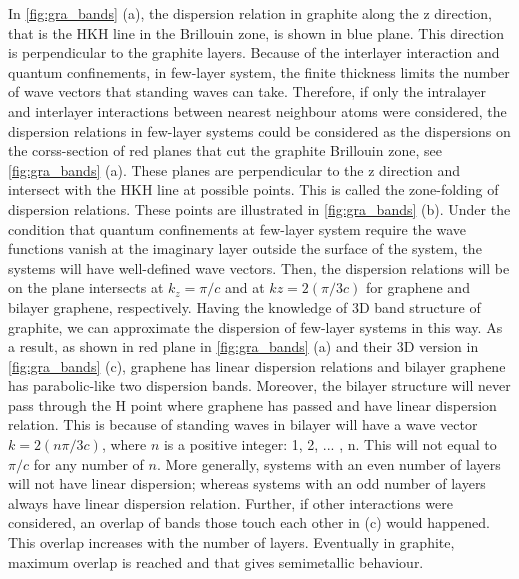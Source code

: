 In \autoref{fig:gra_bands} (a), the dispersion relation in graphite along the z direction, that is the HKH line in the Brillouin zone, is shown in blue plane. This direction is perpendicular to the graphite layers. Because of the interlayer interaction and quantum confinements, in few-layer system, the finite thickness limits the number of wave vectors that standing waves can take.  Therefore, if only the intralayer and interlayer interactions between nearest neighbour atoms were considered, the dispersion relations in few-layer systems could be considered as the dispersions on the corss-section of red planes that cut the graphite Brillouin zone, see \autoref{fig:gra_bands} (a).  These planes are perpendicular to the z direction and intersect with the HKH line at possible points. This is called the zone-folding of dispersion relations\cite{saito1998physical}. These points are illustrated in \autoref{fig:gra_bands} (b). Under the condition that quantum confinements at few-layer system require the wave functions vanish at the imaginary layer outside the surface of the system, the systems will have well-defined wave vectors. Then, the dispersion relations will be on the plane intersects at $k_z=\pi/c$ and at $kz=2(\pi/3c)$ for graphene and bilayer graphene, respectively.  Having the knowledge of 3D band structure of graphite, we can approximate the dispersion of few-layer systems in this way. As a result, as shown in red plane in \autoref{fig:gra_bands} (a) and their 3D version in \autoref{fig:gra_bands} (c), graphene has linear dispersion relations and bilayer graphene has parabolic-like two dispersion bands. Moreover, the bilayer structure will never pass through the H point where graphene has passed and have linear dispersion relation. This is because of standing waves in bilayer will have a wave vector $k=2(n \pi/3c)$, where $n$ is a positive integer: 1, 2, ... , n. This will not equal to $\pi/c$ for any number of $n$. More generally, systems with an even number of layers will not have linear dispersion; whereas systems with an odd number of layers always have linear dispersion relation. Further, if other interactions were considered, an overlap of bands those touch each other in (c) would happened\cite{Partoens2006}. This overlap increases with the number of layers. Eventually in graphite, maximum overlap is reached and that gives semimetallic behaviour.


